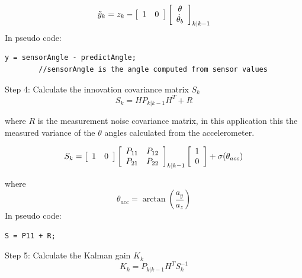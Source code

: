 \documentclass[a4paper]{report}
\begin{document}
		\begin{equation}
		\tilde{y}_{k}=z_{k}-\left[
		\begin{array}{c c}
		1	&	0
		\end{array} \right]
		\left[
		\begin{array}{c}
		\theta \\
		\dot{\theta}_{b}
		\end{array} \right]_{k|k-1}
		\end{equation}
    In pseudo code:
		\begin{lstlisting}[frame=single]
		y = sensorAngle - predictAngle;
		//sensorAngle is the angle computed from sensor values
		\end{lstlisting}
		Step 4: Calculate the innovation covariance matrix $S_{k}$
		\begin{equation}
		\label{eq:innovation-covariance-matrix}
		S_{k}=HP_{k|k-1}H^{T}+R
		\end{equation}

		where $R$ is the measurement noise covariance matrix, in this application this the measured variance of the $\theta$ angles calculated from the accelerometer.

		\begin{equation}
		S_{k}=
		\left[
		\begin{array}{c c}
		1	&	0
		\end{array} \right]
		\left[
		\begin{array}{c c}
		P_{11}	&	P_{12}\\
		P_{21}	&	P_{22}
		\end{array} \right]_{k|k-1}
		\left[
		\begin{array}{c}
		1\\
		0
		\end{array} \right]
		+ \sigma(\theta_{acc})
		\end{equation}

		where
		\begin{equation*}
		\theta_{acc}=\arctan{\left(\frac{a_{y}}{a_{z}}\right)}
		 \end{equation*}
    In pseudo code:
		\begin{lstlisting}[frame=single]
		S = P11 + R;
		\end{lstlisting}
		Step 5: Calculate the Kalman gain $K_{k}$
		\begin{equation}
		\label{eq:kalman-gain}
		K_{k}=P_{k|k-1}H^{T}S^{-1}_{k}
		\end{equation}
\end{document}
